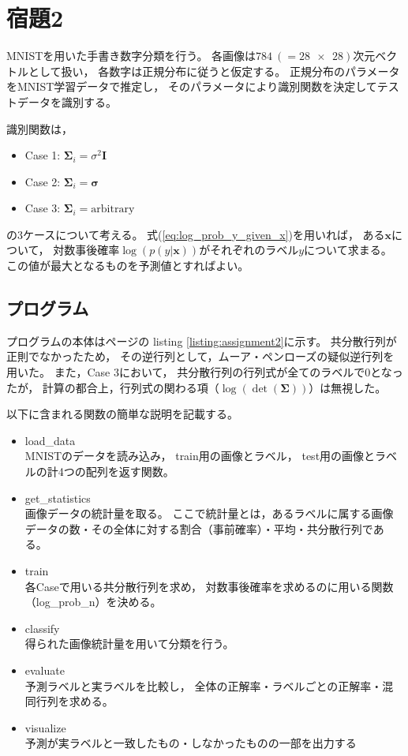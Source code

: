 \documentclass[class=jsarticle, crop=false, dvipdfmx, fleqn]{standalone}
\begin{document}
\section*{宿題2}

MNISTを用いた手書き数字分類を行う。
各画像は\(784\ (= \num{28 x 28})\)次元ベクトルとして扱い，
各数字は正規分布に従うと仮定する。
正規分布のパラメータをMNIST学習データで推定し，
そのパラメータにより識別関数を決定してテストデータを識別する。

識別関数は，
\begin{itemize}
    \item Case 1: \(\bm{\Sigma}_i = \sigma^2 \bm{I}\)
    \item Case 2: \(\bm{\Sigma}_i = \bm{\sigma}\)
    \item Case 3: \(\bm{\Sigma}_i = \text{arbitrary}\)
\end{itemize}
の3ケースについて考える。
式(\ref{eq:log_prob_y_given_x})を用いれば，
ある\(\bm{x}\)について，
対数事後確率\(\log(p(y|\bm{x}))\)がそれぞれのラベル\(y\)について求まる。
この値が最大となるものを予測値とすればよい。



\subsection*{プログラム}

プログラムの本体は\pageref{listing:assignment2}ページの
listing \ref{listing:assignment2}に示す。
共分散行列が正則でなかったため，
その逆行列として，ムーア・ペンローズの疑似逆行列を用いた。
また，Case 3において，
共分散行列の行列式が全てのラベルで0となったが，
計算の都合上，行列式の関わる項（\(\log(\det(\bm{\Sigma}))\)）は無視した。

以下に含まれる関数の簡単な説明を記載する。

\begin{itemize}
    \item load\_data \\
        MNISTのデータを読み込み，
        train用の画像とラベル，
        test用の画像とラベルの計4つの配列を返す関数。
    \item get\_statistics \\
        画像データの統計量を取る。
        ここで統計量とは，あるラベルに属する画像データの数・その全体に対する割合（事前確率）・平均・共分散行列である。
    \item train \\
        各Caseで用いる共分散行列を求め，
        対数事後確率を求めるのに用いる関数（log\_prob\_n）を決める。
    \item classify \\
        得られた画像統計量を用いて分類を行う。
    \item evaluate \\
        予測ラベルと実ラベルを比較し，
        全体の正解率・ラベルごとの正解率・混同行列を求める。
    \item visualize \\
        予測が実ラベルと一致したもの・しなかったものの一部を出力する
\end{itemize}
\end{document}
